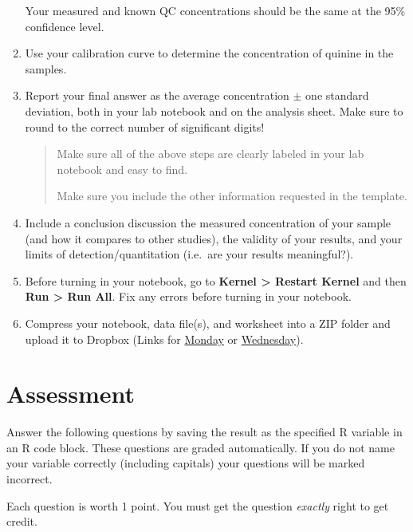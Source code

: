 \documentclass[]{tufte-book}
\begin{document}
\begin{enumerate}
  \begin{marginfigure}
   Your measured and known QC concentrations should be the same at the 95\%
   confidence level.
   \end{marginfigure}
\item
  Use your calibration curve to determine the concentration of quinine in the samples.\\
\item
  Report your final answer as the average concentration \(\pm\) one standard deviation, both in your lab notebook and on the analysis sheet. Make sure to round to the correct number of significant digits!

  \begin{quote}
  Make sure all of the above steps are clearly labeled in your lab notebook and easy to find.

  Make sure you include the other information requested in the template.
  \end{quote}
\item
  Include a conclusion discussion the measured concentration of your sample (and how it compares to other studies), the validity of your results, and your limits of detection/quantitation (i.e.~are your results meaningful?).
\item
  Before turning in your notebook, go to \textbf{Kernel \textgreater{} Restart Kernel} and then \textbf{Run \textgreater{} Run All}. Fix any errors before turning in your notebook.
\item
  Compress your notebook, data file(s), and worksheet into a ZIP folder and upload it to Dropbox (Links for \href{https://alphonse.github.io/chem370/assignments/submissions.html}{Monday} or \href{https://alphonse.github.io/chem370/assignments/submissions-wednesday.html}{Wednesday}).
\end{enumerate}

\hypertarget{assessment}{%
\section{Assessment}\label{assessment}}

Answer the following questions by saving the result as the specified R variable in an R code block. These questions are graded automatically. If you do not name your variable correctly (including capitals) your questions will be marked incorrect.

Each question is worth 1 point. You must get the question \emph{exactly} right to get credit.
\end{document}
